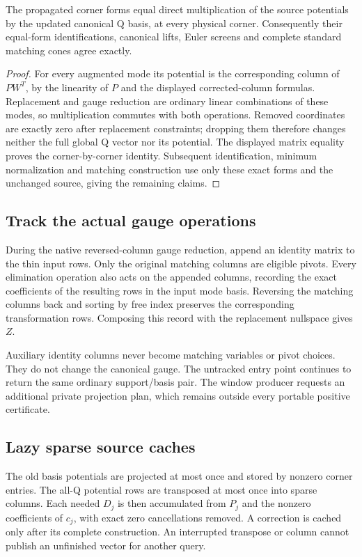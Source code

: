 \begin{proposition}
The propagated corner forms equal direct multiplication of the source
potentials by the updated canonical Q basis, at every physical corner.
Consequently their equal-form identifications, canonical lifts, Euler
screens and complete standard matching cones agree exactly.
\end{proposition}
\begin{proof}
For every augmented mode its potential is the corresponding column of
$PW^T$, by the linearity of $P$ and the displayed corrected-column formulas.
Replacement and gauge reduction are ordinary linear combinations of these
modes, so multiplication commutes with both operations. Removed coordinates
are exactly zero after replacement constraints; dropping them therefore
changes neither the full global Q vector nor its potential. The displayed
matrix equality proves the corner-by-corner identity. Subsequent
identification, minimum normalization and matching construction use only
these exact forms and the unchanged source, giving the remaining claims.
\end{proof}

\subsection{Track the actual gauge operations}

During the native reversed-column gauge reduction, append an identity
matrix to the thin input rows. Only the original matching columns are
eligible pivots. Every elimination operation also acts on the appended
columns, recording the exact coefficients of the resulting rows in the
input mode basis. Reversing the matching columns back and sorting by free
index preserves the corresponding transformation rows. Composing this
record with the replacement nullspace gives $Z$.

Auxiliary identity columns never become matching variables or pivot choices.
They do not change the canonical gauge. The untracked entry point continues
to return the same ordinary support/basis pair. The window producer requests
an additional private projection plan, which remains outside every portable
positive certificate.

\subsection{Lazy sparse source caches}

The old basis potentials are projected at most once and stored by nonzero
corner entries. The all-Q potential rows are transposed at most once into
sparse columns. Each needed $D_j$ is then accumulated from $P_j$ and the
nonzero coefficients of $c_j$, with exact zero cancellations removed.
A correction is cached only after its complete construction. An interrupted
transpose or column cannot publish an unfinished vector for another query.

